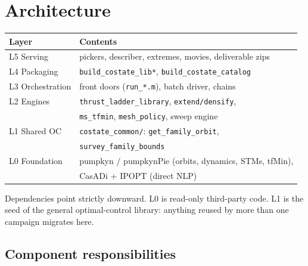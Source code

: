 \documentclass[11pt]{article}
\begin{document}
\section{Architecture}

\begin{center}
\begin{tabular}{ll}
\toprule
\textbf{Layer} & \textbf{Contents}\\
\midrule
L5 Serving      & pickers, describer, extremes, movies, deliverable zips\\
L4 Packaging    & \texttt{build\_costate\_lib*}, \texttt{build\_costate\_catalog}\\
L3 Orchestration& front doors (\texttt{run\_*.m}), batch driver, chains\\
L2 Engines      & \texttt{thrust\_ladder\_library}, \texttt{extend/densify},\\
                & \texttt{ms\_tfmin}, \texttt{mesh\_policy}, sweep engine\\
L1 Shared OC    & \texttt{costate\_common/}: \texttt{get\_family\_orbit},\\
                & \texttt{survey\_family\_bounds}\\
L0 Foundation   & pumpkyn / pumpkynPie (orbits, dynamics, STMs, tfMin),\\
                & CasADi $+$ IPOPT (direct NLP)\\
\bottomrule
\end{tabular}
\end{center}

Dependencies point strictly downward. L0 is read-only third-party code.
L1 is the seed of the general optimal-control library: anything reused by
more than one campaign migrates here.

\subsection{Component responsibilities}
\end{document}
